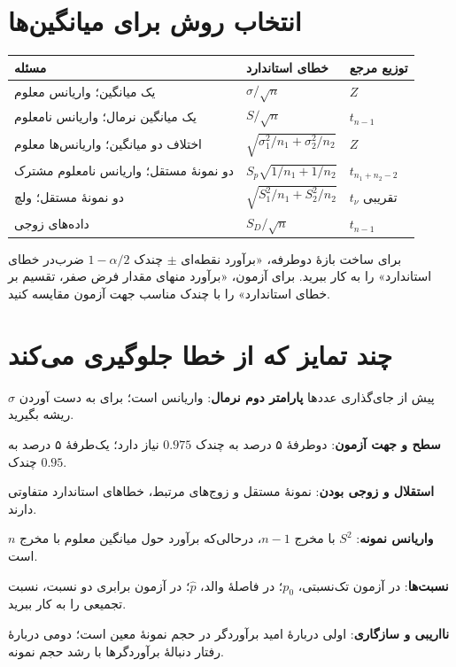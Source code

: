 \documentclass[12pt,a4paper,oneside]{report}
\newcounter{ex}[chapter]
\begin{document}
\section{انتخاب روش برای میانگین‌ها}
\begin{center}\small
\renewcommand{\arraystretch}{1.15}
\begin{tabular}{>{\raggedleft\arraybackslash}p{57mm} >{\centering\arraybackslash}p{59mm} >{\centering\arraybackslash}p{24mm}}
\toprule
مسئله & خطای استاندارد & توزیع مرجع\\
\midrule
یک میانگین؛ واریانس معلوم & $\sigma/\sqrt n$ & $Z$\\
یک میانگین نرمال؛ واریانس نامعلوم & $S/\sqrt n$ & $t_{n-1}$\\
اختلاف دو میانگین؛ واریانس‌ها معلوم & $\sqrt{\sigma_1^2/n_1+\sigma_2^2/n_2}$ & $Z$\\
دو نمونهٔ مستقل؛ واریانس نامعلوم مشترک & $S_p\sqrt{1/n_1+1/n_2}$ & $t_{n_1+n_2-2}$\\
دو نمونهٔ مستقل؛ ولچ & $\sqrt{S_1^2/n_1+S_2^2/n_2}$ & $t_\nu$ تقریبی\\
داده‌های زوجی & $S_D/\sqrt n$ & $t_{n-1}$\\
\bottomrule
\end{tabular}
\end{center}
برای ساخت بازهٔ دوطرفه، «برآورد نقطه‌ای $\pm$ چندک $1-\alpha/2$ ضرب‌در خطای استاندارد» را به کار ببرید. برای آزمون، «برآورد منهای مقدار فرض صفر، تقسیم بر خطای استاندارد» را با چندک مناسب جهت آزمون مقایسه کنید.
\section{چند تمایز که از خطا جلوگیری می‌کند}
\begin{important}{پیش از جای‌گذاری عددها}
\textbf{پارامتر دوم نرمال}: واریانس است؛ برای به دست آوردن $\sigma$ ریشه بگیرید.

\textbf{سطح و جهت آزمون}: دوطرفهٔ ۵ درصد به چندک $0.975$ نیاز دارد؛ یک‌طرفهٔ ۵ درصد به چندک $0.95$.

\textbf{استقلال و زوجی بودن}: نمونهٔ مستقل و زوج‌های مرتبط، خطاهای استاندارد متفاوتی دارند.

\textbf{واریانس نمونه}: $S^2$ با مخرج $n-1$، درحالی‌که برآورد حول میانگین معلوم با مخرج $n$ است.

\textbf{نسبت‌ها}: در آزمون تک‌نسبتی، $p_0$؛ در فاصلهٔ والد، $\widehat p$؛ در آزمون برابری دو نسبت، نسبت تجمیعی را به کار ببرید.

\textbf{نااریبی و سازگاری}: اولی دربارهٔ امید برآوردگر در حجم نمونهٔ معین است؛ دومی دربارهٔ رفتار دنبالهٔ برآوردگرها با رشد حجم نمونه.
\end{important}
\clearpage
\end{document}
